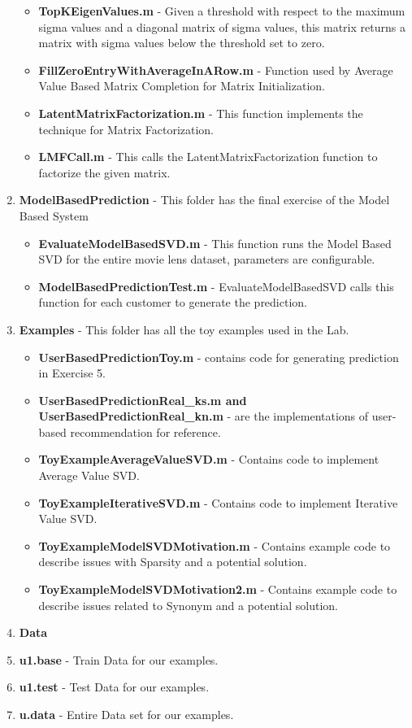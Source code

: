 \begin{enumerate}
\begin{itemize}
\item \textbf{TopKEigenValues.m} - Given a threshold with respect to the maximum sigma values and a diagonal matrix of sigma values, this matrix returns a matrix with sigma values below the threshold set to zero.
\item \textbf{FillZeroEntryWithAverageInARow.m} - Function used by Average Value Based Matrix Completion for Matrix Initialization.
\item \textbf{LatentMatrixFactorization.m} - This function implements the technique for Matrix Factorization.
\item \textbf{LMFCall.m} - This calls the LatentMatrixFactorization function to factorize the given matrix.
\end{itemize}
\item \textbf{ModelBasedPrediction} - This folder has the final exercise of the Model Based System
\begin{itemize}
\item \textbf{EvaluateModelBasedSVD.m} - This function runs the Model Based SVD for the entire movie lens dataset, parameters are configurable.
\item \textbf{ModelBasedPredictionTest.m} - EvaluateModelBasedSVD calls this function for each customer to generate the prediction.
\end{itemize}
\item \textbf{Examples} - This folder has all the toy examples used in the Lab.
\begin{itemize}
\item \textbf{UserBasedPredictionToy.m} - contains code for generating prediction in Exercise 5.
\item \textbf{UserBasedPredictionReal\_ks.m and UserBasedPredictionReal\_kn.m} - are the implementations of user-based recommendation for reference.
\item \textbf{ToyExampleAverageValueSVD.m} - Contains code to implement Average Value SVD.
\item \textbf{ToyExampleIterativeSVD.m} - Contains code to implement Iterative Value SVD.
\item \textbf{ToyExampleModelSVDMotivation.m} - Contains example code to describe issues with Sparsity and a potential solution.
\item \textbf{ToyExampleModelSVDMotivation2.m} - Contains example code to describe issues related to Synonym and a potential solution.
\end{itemize}
\item \textbf{Data}
\item \textbf{u1.base} - Train Data for our examples.
\item \textbf{u1.test} - Test Data for our examples.
\item \textbf{u.data} - Entire Data set for our examples.
\end{enumerate}
